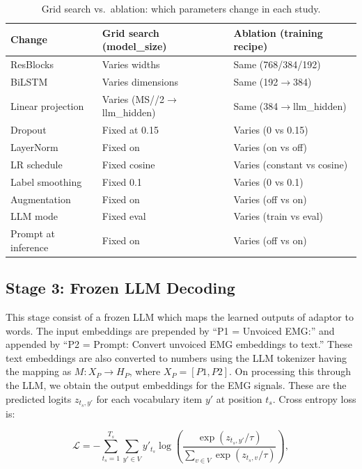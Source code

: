 \begin{table}[ht]
\centering
\caption{Grid search vs.\ ablation: which parameters change in each study.}
\label{tab:grid_vs_ablation}
\begin{tabular}{lll}
\toprule
\textbf{Change} & \textbf{Grid search (model\_size)} & \textbf{Ablation (training recipe)} \\
\midrule
ResBlocks & Varies widths & Same (768/384/192) \\
BiLSTM & Varies dimensions & Same (192$\to$384) \\
Linear projection & Varies (MS//2$\to$llm\_hidden) & Same (384$\to$llm\_hidden) \\
Dropout & Fixed at 0.15 & Varies (0 vs 0.15) \\
LayerNorm & Fixed on & Varies (on vs off) \\
LR schedule & Fixed cosine & Varies (constant vs cosine) \\
Label smoothing & Fixed 0.1 & Varies (0 vs 0.1) \\
Augmentation & Fixed on & Varies (off vs on) \\
LLM mode & Fixed eval & Varies (train vs eval) \\
Prompt at inference & Fixed on & Varies (off vs on) \\
\bottomrule
\end{tabular}
\end{table}

\subsection{Stage 3: Frozen LLM Decoding}

This stage consist of a frozen LLM which maps the learned outputs of adaptor to words. The input embeddings are prepended by ``P1 = Unvoiced EMG:'' and appended by ``P2 = Prompt: Convert unvoiced EMG embeddings to text.'' These text embeddings are also converted to numbers using the LLM tokenizer having the mapping as $M : X_P \to H_P$, where $X_P = [P1, P2]$. On processing this through the LLM, we obtain the output embeddings for the EMG signals. These are the predicted logits $z_{t_s,y'}$ for each vocabulary item $y'$ at position $t_s$. Cross entropy loss is:

\begin{equation}
\mathcal{L} = -\sum_{t_s=1}^{T_s} \sum_{y' \in V} y'_{t_s} \log \left( \frac{\exp(z_{t_s,y'}/\tau)}{\sum_{v \in V} \exp(z_{t_s,v}/\tau)} \right),
\end{equation}

